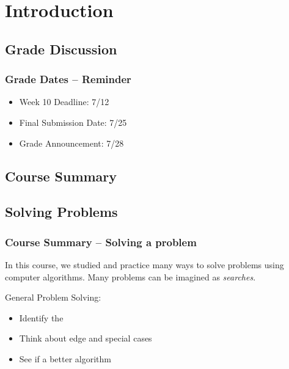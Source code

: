 \section{Introduction}


\subsection{Grade Discussion}

\begin{frame}
  \frametitle{Grade Dates -- Reminder}

  \begin{itemize}
  \item Week 10 Deadline: 7/12
    \bigskip

  \item Final Submission Date: 7/25
    \bigskip

  \item Grade Announcement: 7/28
  \end{itemize}
\end{frame}

\subsection{Course Summary}

\subsection{Solving Problems}
\begin{frame}
  \frametitle{Course Summary -- Solving a problem}

  \begin{block}{}
    In this course, we studied and practice many ways
    to solve problems using computer algorithms. Many
    problems can be imagined as \emph{searches}.
  \end{block}

  \vfill

  General Problem Solving:
  \begin{itemize}
  \item Identify the 
  \item Think about edge and special cases
  \item See if a better algorithm 
  \end{itemize}

\end{frame}

